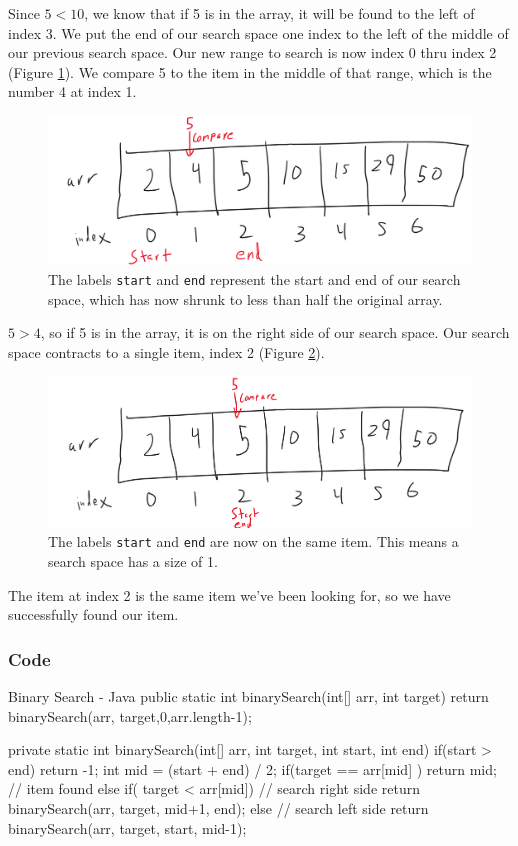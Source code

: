 Since $5 < 10$, we know that if 5 is in the array, it will be found to the left of index 3.  We put the end of our search space one index to the left of the middle of our previous search space.  Our new range to search is now index 0 thru index 2 (Figure \ref{fig:binarysearch3}).  We compare 5 to the item in the middle of that range, which is the number 4 at index 1.  



\begin{figure}[h!]
	\centering
	\includegraphics[width=0.7\linewidth]{pics/binarySearch3}
	\caption{The labels \texttt{start} and \texttt{end} represent the start and end of our search space, which has now shrunk to less than half the original array.}
	\label{fig:binarysearch3}
\end{figure}

$5 > 4$, so if 5 is in the array, it is on the right side of our search space.  Our search space contracts to a single item, index 2 (Figure \ref{fig:binarysearch4}).  

\begin{figure}[h!]
	\centering
	\includegraphics[width=0.7\linewidth]{pics/binarySearch4}
	\caption{The labels \texttt{start} and \texttt{end} are now on the same item.  This means a search space has a size of 1.}
	\label{fig:binarysearch4}
\end{figure}


The item at index 2 is the same item we've been looking for, so we have successfully found our item.

\subsubsection{Code}

\begin{javacode}{Binary Search - Java}
public static int binarySearch(int[] arr, int target) {
	return binarySearch(arr, target,0,arr.length-1);
}

private static int binarySearch(int[] arr, int target, int start, int end) {
	if(start > end) {
		return -1;
	}
	int mid = (start + end) / 2;
	if(target == arr[mid] ) {
		return mid; // item found
	} else if( target < arr[mid]) {
		// search right side
		return binarySearch(arr, target, mid+1, end);
	} else {
		// search left side
		return binarySearch(arr, target, start, mid-1);
	}
}
\end{javacode}


